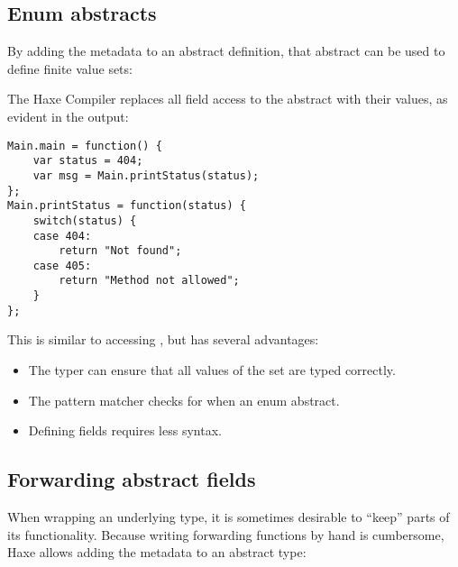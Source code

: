 {


\subsection{Enum abstracts}
\label{types-abstract-enum}

By adding the  metadata to an abstract definition, that abstract can be used to define finite value sets:


The Haxe Compiler replaces all field access to the  abstract with their values, as evident in the  output:

\begin{lstlisting}
Main.main = function() {
	var status = 404;
	var msg = Main.printStatus(status);
};
Main.printStatus = function(status) {
	switch(status) {
	case 404:
		return "Not found";
	case 405:
		return "Method not allowed";
	}
};
\end{lstlisting}

This is similar to accessing , but has several advantages:

\begin{itemize}
	\item The typer can ensure that all values of the set are typed correctly.
	\item The pattern matcher checks for  when  an enum abstract.
	\item Defining fields requires less syntax.
\end{itemize}


\subsection{Forwarding abstract fields}
\label{types-abstract-forward}

When wrapping an underlying type, it is sometimes desirable to ``keep'' parts of its functionality. Because writing forwarding functions by hand is cumbersome, Haxe allows adding the  metadata to an abstract type:

}
